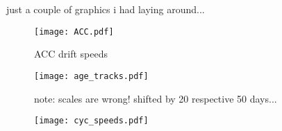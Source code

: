 just a couple of graphics i had laying around...




\begin{figure}
 \centering
 \texttt{[image: ACC.pdf]}
 \caption{ACC drift speeds}
 \label{fig:ACC}
\end{figure}

\begin{figure}
 \centering
 \texttt{[image: age\_tracks.pdf]}
  \caption{note: scales are wrong! shifted by 20 respective 50 days...}
  \label{fig:age_tracks}
\end{figure}

\begin{figure}
 \centering
 \texttt{[image: cyc\_speeds.pdf]}
 \label{fig:cyc_speeds}
\end{figure}
